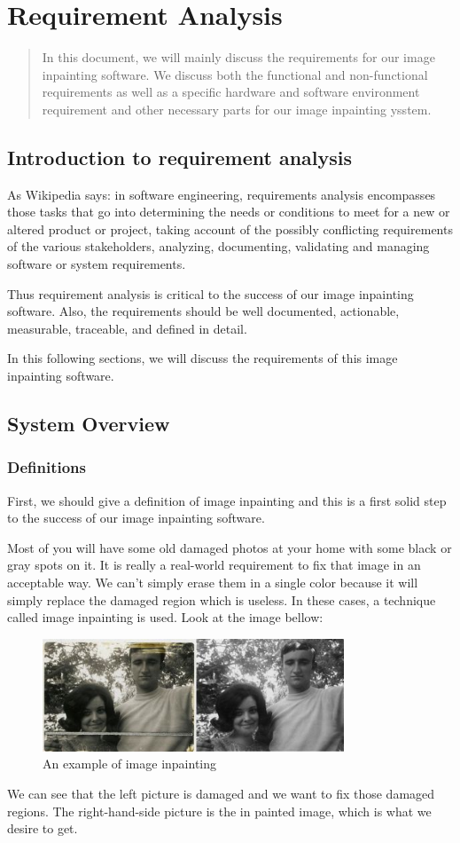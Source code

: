 \chapter{Requirement Analysis}
\begin{abstract}
In this document, we will mainly discuss the requirements for our image inpainting software.
We discuss both the functional and non-functional requirements as well as a specific hardware and software environment requirement and other necessary parts for our image inpainting ysstem.
\end{abstract}

\section{Introduction to requirement analysis}
As Wikipedia says: in software engineering, requirements analysis encompasses those tasks that go into determining the needs or conditions to meet for a new or altered product or project, taking account of the possibly conflicting requirements of the various stakeholders, analyzing, documenting, validating and managing software or system requirements.

Thus requirement analysis is critical to the success of our image inpainting software. Also, the requirements should be well documented, actionable, measurable, traceable, and defined in detail.

In this following sections, we will discuss the requirements of this image inpainting software.

\section{System Overview}
\subsection{Definitions}
First, we should give a definition of image inpainting and this is a first solid step to the success of our image inpainting software.

Most of you will have some old damaged photos at your home with some black or gray spots on it. It is really a real-world requirement to fix that image in an acceptable way. We can't simply erase them in a single color because it will simply replace the damaged region which is useless. In these cases, a technique called image inpainting is used. Look at the image bellow:
\begin{figure}[H]
\centering
\includegraphics[width=9cm]{def.jpg}
\caption{An example of image inpainting}
\end{figure}
We can see that the left picture is damaged and
we want to fix those damaged regions. The right-hand-side picture is the in painted image, which is what we desire to get.

